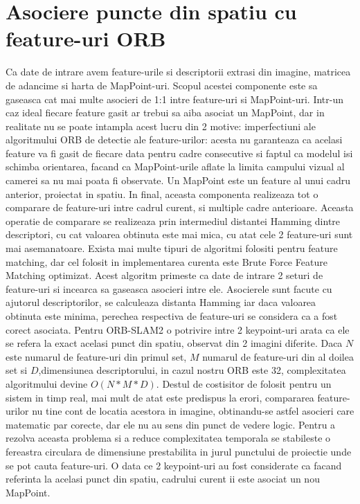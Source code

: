 \documentclass[12pt,a4paper]{report}
\begin{document}
\section{Asociere puncte din spatiu cu feature-uri ORB}
Ca date de intrare avem feature-urile si descriptorii extrasi din imagine, matricea
de adancime si harta de MapPoint-uri. Scopul acestei componente este sa gaseasca 
cat mai multe asocieri de 1:1 intre feature-uri si MapPoint-uri. Intr-un caz ideal
fiecare feature gasit ar trebui sa aiba asociat un MapPoint, dar in realitate nu se 
poate intampla acest lucru din 2 motive: 
imperfectiuni ale algoritmului ORB de detectie ale feature-urilor: acesta nu garanteaza 
ca acelasi feature va fi gasit de fiecare data pentru cadre consecutive si faptul ca 
modelul isi schimba orientarea, facand ca MapPoint-urile aflate la limita campului 
vizual al camerei sa nu mai poata fi observate. Un MapPoint este un feature 
al unui cadru anterior, proiectat in spatiu. In final, aceasta componenta realizeaza 
tot o comparare de feature-uri intre cadrul curent, si multiple cadre anterioare.
Aceasta operatie de comparare se realizeaza prin intermediul distantei Hamming dintre
descriptori, cu cat valoarea obtinuta este mai mica, cu atat cele 2 feature-uri sunt 
mai asemanatoare. Exista mai multe tipuri de algoritmi folositi pentru feature 
matching, dar cel folosit in implementarea curenta este Brute Force Feature Matching
optimizat. Acest algoritm primeste ca date de intrare 2 seturi de feature-uri si 
incearca sa gaseasca asocieri intre ele. Asocierele sunt facute cu ajutorul descriptorilor,
se calculeaza distanta Hamming iar daca valoarea obtinuta este minima, perechea 
respectiva de feature-uri se considera ca a fost corect asociata. Pentru ORB-SLAM2 
o potrivire intre 2 keypoint-uri arata ca ele se refera la exact acelasi punct din spatiu,
observat din 2 imagini diferite.
Daca \(N\) este numarul de feature-uri din primul set, \(M\) numarul de feature-uri din 
al doilea set si \(D\),dimensiunea descriptorului, in cazul nostru ORB este 32, complexitatea
algoritmului devine \(O(N * M * D)\). Destul de costisitor de folosit
pentru un sistem in timp real, mai mult de atat este predispus la erori, compararea 
feature-urilor nu tine cont de locatia acestora in imagine, obtinandu-se astfel asocieri
care matematic par corecte, dar ele nu au sens din punct de vedere logic. Pentru a rezolva
aceasta problema si a reduce complexitatea temporala se stabileste o fereastra circulara de 
dimensiune prestabilita in jurul punctului de proiectie unde se pot cauta feature-uri.
O data ce 2 keypoint-uri au fost considerate ca facand referinta la acelasi punct din spatiu,
cadrului curent ii este asociat un nou MapPoint. 
\end{document}
